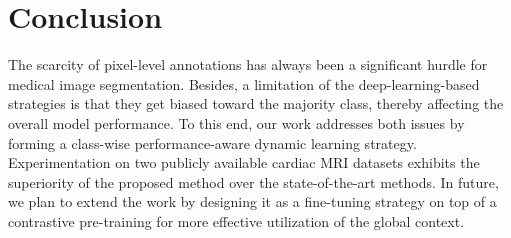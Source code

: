 \documentclass[runningheads]{llncs}
\begin{document}
\section{Conclusion}
The scarcity of pixel-level annotations has always been a significant hurdle for medical image segmentation. Besides, a limitation of the deep-learning-based strategies is that they get biased toward the majority class, thereby affecting the overall model performance. To this end, our work addresses both issues by forming a class-wise performance-aware dynamic learning strategy. Experimentation on two publicly available cardiac MRI datasets exhibits the superiority of the proposed method over the state-of-the-art methods. In future, we plan to extend the work by designing it as a fine-tuning strategy on top of a contrastive pre-training for more effective utilization of the global context. 






\end{document}
